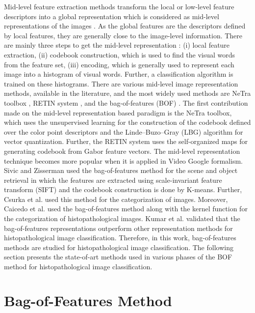 Mid-level feature extraction methods transform the local or low-level feature descriptors into a global representation which is considered as mid-level representations of the images \cite{boureau2010}. As the global features are the descriptors defined by local features, they are generally close to the image-level information.  There are mainly three steps to get the mid-level representation \cite{boureau2010}: (i) local feature extraction, (ii) codebook construction, which is used to find the visual words from the feature set, (iii) encoding, which is generally used to represent each image into a histogram of visual words. Further, a classification algorithm is trained on these histograms.  There are various mid-level image representation methods, available in the literature, and the most widely used methods are NeTra toolbox \cite{ma1999}, RETIN system \cite{fournier2001}, and the bag-of-features (BOF) \cite{caicedo2009}. The first contribution made on the mid-level representation based paradigm is the NeTra toolbox, which uses the unsupervised learning for the construction of the codebook defined over the color point descriptors and the Linde–Buzo–Gray (LBG) algorithm \cite{linde1980} for vector quantization. Further, the RETIN system \cite{fournier2001} uses the self-organized maps \cite{kohonen1982} for generating codebook from Gabor feature vectors. The mid-level representation technique becomes more popular when it is applied in Video Google formalism. Sivic and Zisserman \cite{sivic2003} used the bag-of-features method for the scene and object retrieval in which the features are extracted using scale-invariant feature transform (SIFT) and the codebook construction is done by K-means. Further, Csurka et al. \cite{csurka2004} used this method for the categorization of images. Moreover, Caicedo et al. \cite{caicedo2009} used the bag-of-features method along with the kernel function for the categorization of histopathological images. Kumar et al. \cite{kumar2017} validated that the bag-of-features representations outperform other representation methods for histopathological image classification. Therefore, in this work, bag-of-features methods are studied for histopathological image classification. The following section presents the state-of-art methods used in various phases of the BOF method for histopathological image classification.
  

\section{Bag-of-Features Method}\label{subsubsec:BOF}

